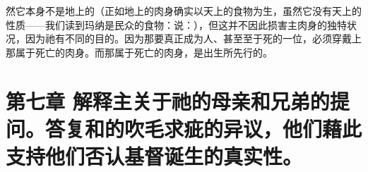 然它本身不是地上的（正如地上的肉身确实以天上的食物为生，虽然它没有天上的性质——我们读到玛纳是民众的食物：说：），但这并不因此损害主肉身的独特状况，因为祂有不同的目的。因为那要真正成为人、甚至至于死的一位，必须穿戴上那属于死亡的肉身。而那属于死亡的肉身，是出生所先行的。\par


\section{第七章 解释主关于祂的母亲和兄弟的提问。答复和的吹毛求疵的异议，他们藉此支持他们否认基督诞生的真实性。}

